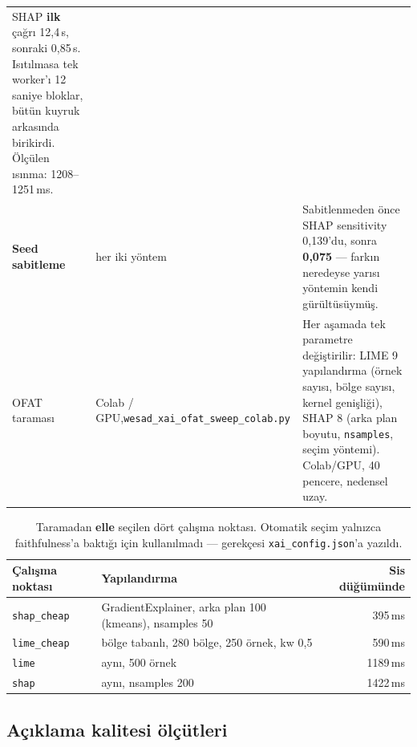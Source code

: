 \documentclass[11pt,a4paper]{article}
\newcommand{\ms}{\,ms}
\newcommand{\kod}[1]{\texttt{\small #1}}
\newcommand{\dosya}[1]{\texttt{\footnotesize #1}}
\begin{document}
\begin{longtable}{@{}p{4.0cm}p{2.9cm}p{8.6cm}@{}}
SHAP \textbf{ilk} çağrı 12{,}4\,s, sonraki 0{,}85\,s. Isıtılmasa tek worker'ı
12 saniye bloklar, bütün kuyruk arkasında birikirdi. Ölçülen ısınma:
1208--1251\ms. \\
\addlinespace
\textbf{Seed sabitleme} & her iki yöntem &
Sabitlenmeden önce SHAP sensitivity 0{,}139'du, sonra \textbf{0{,}075} ---
farkın neredeyse yarısı yöntemin kendi gürültüsüymüş. \\
\addlinespace
OFAT taraması & Colab / GPU,\newline \dosya{wesad\_xai\_ofat\_}\newline\dosya{sweep\_colab.py} &
Her aşamada tek parametre değiştirilir: LIME 9 yapılandırma (örnek sayısı,
bölge sayısı, kernel genişliği), SHAP 8 (arka plan boyutu, \kod{nsamples},
seçim yöntemi). Colab/GPU, 40 pencere, nedensel uzay. \\
\bottomrule
\end{longtable}

\begin{table}[H]
\centering\small
\begin{tabular}{@{}llr@{}}
\toprule
\textbf{Çalışma noktası} & \textbf{Yapılandırma} & \textbf{Sis düğümünde} \\
\midrule
\kod{shap\_cheap} & GradientExplainer, arka plan 100 (kmeans), nsamples 50 & 395\ms \\
\kod{lime\_cheap} & bölge tabanlı, 280 bölge, 250 örnek, kw 0{,}5 & 590\ms \\
\kod{lime}        & aynı, 500 örnek & 1189\ms \\
\kod{shap}        & aynı, nsamples 200 & 1422\ms \\
\bottomrule
\end{tabular}
\caption{Taramadan \textbf{elle} seçilen dört çalışma noktası. Otomatik seçim
yalnızca faithfulness'a baktığı için kullanılmadı --- gerekçesi
\dosya{xai\_config.json}'a yazıldı.}
\end{table}

\subsection{Açıklama kalitesi ölçütleri}
\end{document}
